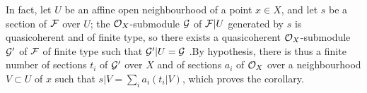 \documentclass[../main.tex]{subfiles}
\begin{document}
In fact, let $U$ be an affine open neighbourhood of a point $x\in X$, and let
$s$ be a section of $\mathcal{F}$ over $U$; the $\mathcal{O}_X$-submodule $\mathcal{G}$ of
$\mathcal{F}|U$ generated by $s$ is quasicoherent and of finite type, so there
exists a quasicoherent $\mathcal{O}_X$-submodule $\mathcal{G}'$ of $\mathcal{F}$ of finite
type such that $\mathcal{G}'|U=\mathcal{G}$ .By hypothesis, there is thus a
finite number of sections $t_i$ of $\mathcal{G}'$ over $X$ and of sections $a_i$
of $\mathcal{O}_X$ over a neighbourhood $V\subset U$ of $x$ such that
$s|V=\sum_i a_i(t_i|V)$, which proves the corollary.
\end{document}
